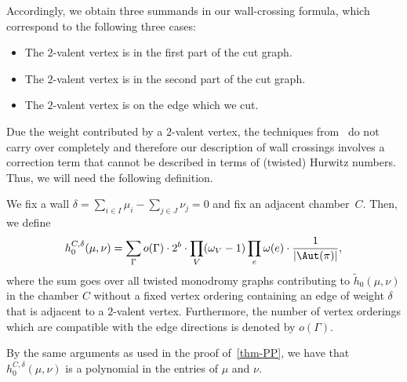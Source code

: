 Accordingly, we obtain three summands in our wall-crossing formula, which correspond to the following three cases:

\begin{itemize}
    \item The $2$-valent vertex is in the first part of the cut graph.
    \item The $2$-valent vertex is in the second part of the cut graph.
    \item The $2$-valent vertex is on the edge which we cut.
\end{itemize}

Due the weight contributed by a $2$-valent vertex, the techniques from~\cite{CJM10} do not carry over completely and therefore our description of wall crossings involves a correction term that cannot be described in terms of (twisted) Hurwitz numbers. Thus, we will need the following definition.

\begin{defi}
We fix a wall $\delta=\sum_{i\in I}\mu_i - \sum_{j\in J}\nu_j=0$ and fix an adjacent chamber~$C$. Then, we define 
\begin{equation*}
    h_0^{C,\delta}(\mu,\nu)=\sum_{\Gamma} o(\Gamma) \cdot 2^{b}\cdot \prod_V (\omega_V-1)\prod_e\omega(e)\cdot \frac{1}{|\Aut(\pi)|},
\end{equation*}
where  the sum goes over all twisted monodromy graphs contributing to $\tilde{h}_0(\mu,\nu)$ in the chamber $C$ without a fixed vertex ordering containing an edge of weight $\delta$ that is adjacent to a $2$-valent vertex. Furthermore, the number of vertex orderings which are compatible with the edge directions is denoted by $o(\Gamma)$.
\end{defi}

By the same arguments as used in the proof of~\cref{thm-PP}, we have that $h_0^{C,\delta}(\mu,\nu)$ is a polynomial in the entries of $\mu$ and $\nu$.


